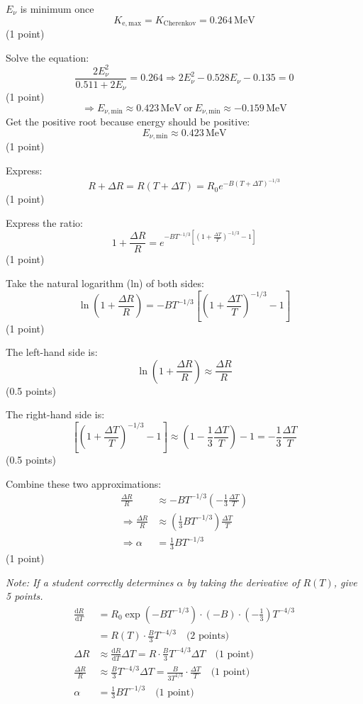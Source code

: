 \begin{description}
  $E_\nu$ is minimum once
  \[ K_{\mathrm{e,max}} = K_{\mathrm{Cherenkov}} = 0.264\,\mathrm{MeV} \]
  \hfill(1 point)

  Solve the equation:
  \[ \frac{2E_\nu^2}{0.511 + 2E_\nu} = 0.264
     \Longrightarrow 2E_\nu^2 - 0.528E_\nu - 0.135 = 0 \]
  \hfill(1 point)
  \[ \Longrightarrow E_{\nu,\mathrm{min}} \approx 0.423\,\mathrm{MeV}
     \ \text{or}\ E_{\nu,\mathrm{min}} \approx -0.159\,\mathrm{MeV} \]
  Get the positive root because energy should be positive:
  \[ E_{\nu,\mathrm{min}} \approx 0.423\,\mathrm{MeV} \]
  \hfill(1 point)

\item[(c)] Express:
  \[ R + \Delta R = R(T + \Delta T) = R_0 e^{-B(T + \Delta T)^{-1/3}} \]
  \hfill(1 point)

  Express the ratio:
  \[ 1 + \frac{\Delta R}{R}
     = e^{-BT^{-1/3}\left[\left(1 + \frac{\Delta T}{T}\right)^{-1/3} - 1\right]} \]
  \hfill(1 point)

  Take the natural logarithm (ln) of both sides:
  \[ \ln\left(1 + \frac{\Delta R}{R}\right)
     = -BT^{-1/3}\left[\left(1 + \frac{\Delta T}{T}\right)^{-1/3} - 1\right] \]
  \hfill(1 point)

  The left-hand side is:
  \[ \ln\left(1 + \frac{\Delta R}{R}\right) \approx \frac{\Delta R}{R} \]
  \hfill(0.5 points)

  The right-hand side is:
  \[ \left[\left(1 + \frac{\Delta T}{T}\right)^{-1/3} - 1\right]
     \approx \left(1 - \frac{1}{3}\frac{\Delta T}{T}\right) - 1
     = -\frac{1}{3}\frac{\Delta T}{T} \]
  \hfill(0.5 points)

  Combine these two approximations:
  \begin{align*}
    \frac{\Delta R}{R} &\approx -BT^{-1/3}\left(-\frac{1}{3}\frac{\Delta T}{T}\right) \\
    \Longrightarrow \frac{\Delta R}{R}
      &\approx \left(\frac{1}{3}BT^{-1/3}\right)\frac{\Delta T}{T} \\
    \Longrightarrow \alpha &= \frac{1}{3}BT^{-1/3}
  \end{align*}
  \hfill(1 point)

  \textit{Note: If a student correctly determines $\alpha$ by taking the
  derivative of $R(T)$, give 5 points.}
  \begin{align*}
    \frac{\mathrm{d}R}{\mathrm{d}T}
      &= R_0 \exp\left(-BT^{-1/3}\right) \cdot (-B) \cdot
         \left(-\frac{1}{3}\right) T^{-4/3} \\
      &= R(T) \cdot \frac{B}{3} T^{-4/3} \quad \text{(2 points)} \\
    \Delta R &\approx \frac{\mathrm{d}R}{\mathrm{d}T}\Delta T
      = R \cdot \frac{B}{3} T^{-4/3}\Delta T \quad \text{(1 point)} \\
    \frac{\Delta R}{R} &\approx \frac{B}{3} T^{-4/3}\Delta T
      = \frac{B}{3T^{1/3}} \cdot \frac{\Delta T}{T} \quad \text{(1 point)} \\
    \alpha &= \frac{1}{3}BT^{-1/3} \quad \text{(1 point)}
  \end{align*}


\end{description}
